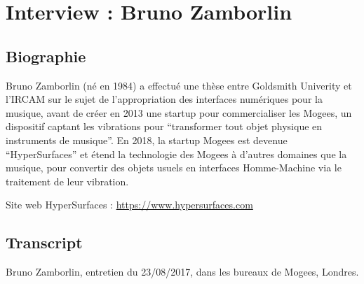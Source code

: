 \chapter{Interview : Bruno Zamborlin}
\label{appendix:zamborlin}

\section*{Biographie}

\noindent Bruno Zamborlin (né en 1984) a effectué une thèse entre Goldsmith Univerity et l'IRCAM sur le sujet de l'appropriation des interfaces numériques pour la musique, avant de créer en 2013 une startup pour commercialiser les Mogees, un dispositif captant les vibrations pour ``transformer tout objet physique en instruments de musique''. En 2018, la startup Mogees est devenue ``HyperSurfaces'' et étend la technologie des Mogees à d'autres domaines que la musique, pour convertir des objets usuels en interfaces Homme-Machine via le traitement de leur vibration.

\noindent Site web HyperSurfaces : \url{https://www.hypersurfaces.com}

\section*{Transcript}

\noindent Bruno Zamborlin, entretien du 23/08/2017, dans les bureaux de Mogees, Londres.




